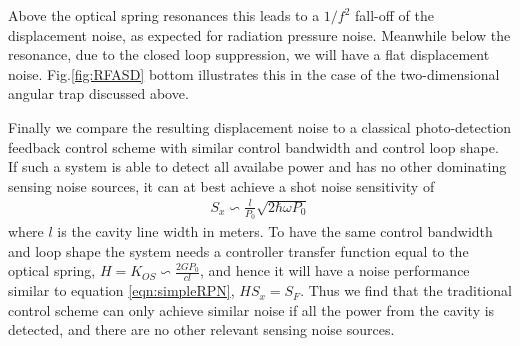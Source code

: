 Above the optical spring resonances this leads to a $1/f^2$ fall-off of the displacement noise, as expected for radiation pressure noise. Meanwhile below the resonance, due to the closed loop suppression, we will have a flat displacement noise. %
Fig.\ref{fig:RFASD} bottom illustrates this in the case of the two-dimensional angular trap discussed above.

Finally we compare the resulting displacement noise to a classical photo-detection feedback control scheme with similar control bandwidth and control loop shape. If such a system is able to detect all availabe power and has no other dominating sensing noise sources, it can at best achieve a shot noise sensitivity of 
\begin{eqnarray}
\label{eqn:classyShot}
S_x \backsim \frac{l}{P_0}\sqrt{2 \hbar \omega P_0}
\end{eqnarray}
where $l$ is the cavity line width in meters. To have the same control bandwidth and loop shape the system needs a controller transfer function equal to the optical spring, $H = K_{OS} \backsim \frac{2 G P_0}{c l}$, and hence it will have a  noise performance similar to equation \ref{eqn:simpleRPN},  $H S_x=S_F$.  
Thus we find that the traditional control scheme can only achieve similar noise if all the power from the cavity is detected, and there are no other relevant sensing noise sources. 




